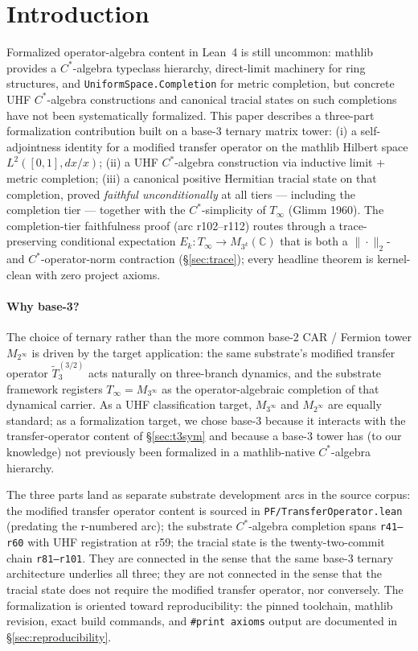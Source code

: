 \documentclass[11pt,a4paper]{amsart}
\theoremstyle{plain}
\theoremstyle{definition}
\begin{document}
\section{Introduction}\label{sec:intro}

Formalized operator-algebra content in Lean~4 is still uncommon: mathlib provides a $C^*$-algebra typeclass hierarchy, direct-limit machinery for ring structures, and \texttt{UniformSpace.Completion} for metric completion, but concrete UHF $C^*$-algebra constructions and canonical tracial states on such completions have not been systematically formalized. This paper describes a three-part formalization contribution built on a base-3 ternary matrix tower: (i) a self-adjointness identity for a modified transfer operator on the mathlib Hilbert space $L^2([0,1], dx/x)$; (ii) a UHF $C^*$-algebra construction via inductive limit + metric completion; (iii) a canonical positive Hermitian tracial state on that completion, proved \emph{faithful unconditionally} at all tiers --- including the completion tier --- together with the $C^*$-simplicity of $T_\infty$ (Glimm 1960). The completion-tier faithfulness proof (arc r102--r112) routes through a trace-preserving conditional expectation $E_k \colon T_\infty \to M_{3^k}(\mathbb{C})$ that is both a $\|\cdot\|_2$- and $C^*$-operator-norm contraction (\S\ref{sec:trace}); every headline theorem is kernel-clean with zero project axioms.

\paragraph{Why base-3?} The choice of ternary rather than the more common base-2 CAR / Fermion tower $M_{2^\infty}$ is driven by the target application: the same substrate's modified transfer operator $\widetilde{T}_3^{(3/2)}$ acts naturally on three-branch dynamics, and the substrate framework registers $T_\infty = M_{3^\infty}$ as the operator-algebraic completion of that dynamical carrier. As a UHF classification target, $M_{3^\infty}$ and $M_{2^\infty}$ are equally standard; as a formalization target, we chose base-3 because it interacts with the transfer-operator content of \S\ref{sec:t3sym} and because a base-3 tower has (to our knowledge) not previously been formalized in a mathlib-native $C^*$-algebra hierarchy.

The three parts land as separate substrate development arcs in the source corpus: the modified transfer operator content is sourced in \texttt{PF/TransferOperator.lean} (predating the r-numbered arc); the substrate $C^*$-algebra completion spans \texttt{r41--r60} with UHF registration at r59; the tracial state is the twenty-two-commit chain \texttt{r81--r101}. They are connected in the sense that the same base-3 ternary architecture underlies all three; they are not connected in the sense that the tracial state does not require the modified transfer operator, nor conversely. The formalization is oriented toward reproducibility: the pinned toolchain, mathlib revision, exact build commands, and \texttt{\#print axioms} output are documented in \S\ref{sec:reproducibility}.
\end{document}
